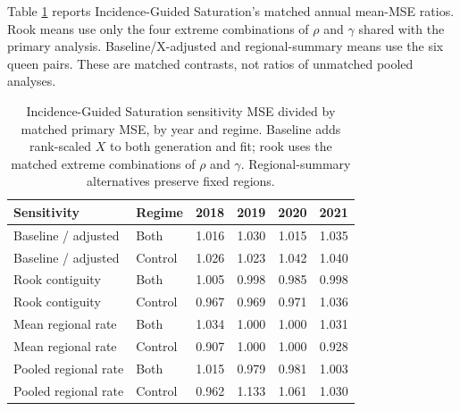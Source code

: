 \documentclass[11pt]{article}
\begin{document}
Table \ref{tab:nc-summary-sens} reports Incidence-Guided Saturation's matched
annual mean-MSE ratios. Rook means use only the four extreme combinations of $\rho$ and $\gamma$ shared with the primary analysis. Baseline/X-adjusted and regional-summary means use the six
queen pairs. These are matched contrasts, not ratios of unmatched pooled
analyses.

\begin{table}[!htb]
\small
\centering

\caption{Incidence-Guided Saturation sensitivity MSE divided by matched primary MSE, by year and regime. Baseline adds rank-scaled $X$ to both generation and fit; rook uses the matched extreme combinations of $\rho$ and $\gamma$. Regional-summary alternatives preserve fixed regions.}
\label{tab:nc-summary-sens}

\begin{tabular}{llrrrr}
\toprule
Sensitivity & Regime & 2018 & 2019 & 2020 & 2021 \\
\midrule
Baseline / adjusted & Both & 1.016 & 1.030 & 1.015 & 1.035 \\
Baseline / adjusted & Control & 1.026 & 1.023 & 1.042 & 1.040 \\
Rook contiguity & Both & 1.005 & 0.998 & 0.985 & 0.998 \\
Rook contiguity & Control & 0.967 & 0.969 & 0.971 & 1.036 \\
Mean regional rate & Both & 1.034 & 1.000 & 1.000 & 1.031 \\
Mean regional rate & Control & 0.907 & 1.000 & 1.000 & 0.928 \\
Pooled regional rate & Both & 1.015 & 0.979 & 0.981 & 1.003 \\
Pooled regional rate & Control & 0.962 & 1.133 & 1.061 & 1.030 \\

\bottomrule
\end{tabular}
\end{table}
\FloatBarrier


\end{document}
